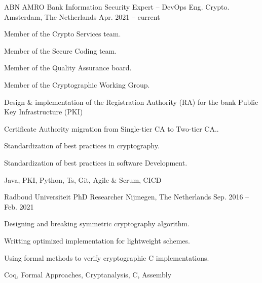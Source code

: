 

\begin{cventries}

	\cventrysix%
	{ABN AMRO Bank} %
	{Information Security Expert -- DevOps Eng. Crypto.} %
	{Amsterdam, The Netherlands} %
	{Apr. 2021 -- current} %
	{
		\begin{cvitems} %
			\item {Member of the Crypto Services team.}
			\item {Member of the Secure Coding team.}
			\item {Member of the Quality Assurance board.}
			\item {Member of the Cryptographic Working Group.}
			\item {Design \& implementation of the Registration Authority (RA) for the bank Public Key Infrastructure (PKI)} %
			\item {Certificate Authority migration from Single-tier CA to Two-tier CA..} %
			\item {Standardization of best practices in cryptography.}
			\item {Standardization of best practices in software Development.}
		\end{cvitems}
	}%
	{Java, PKI, Python, Ts, Git, Agile \& Scrum, CICD}%


	\cventrysix%
	{Radboud Universiteit} %
	{PhD Researcher} %
	{Nijmegen, The Netherlands} %
	{Sep. 2016 -- Feb. 2021} %
	{
		\begin{cvitems} %
			\item {Designing and breaking symmetric cryptography algorithm.}
			\item {Writting optimized implementation for lightweight schemes.}
			\item {Using formal methods to verify cryptographic C implementations.}
		\end{cvitems}
	}%
	{Coq, Formal Approaches, Cryptanalysis, C, Assembly}%


\end{cventries}
